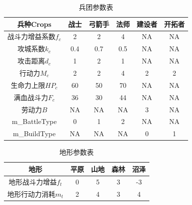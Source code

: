 \documentclass[a4paper,4pt]{article}
\begin{document}
\begin{table}[htbp]
	\centering
	\caption{兵团参数表}
	\begin{tabular}{c|c|c|c|c|c}
		\hline
		兵种Crops           & 战士 & 弓箭手 & 法师 & 建设者 & 开拓者 \bigstrut \\
		\hline
		战斗力增益系数$f_c$ & 2    & 2      & 4    & NA     & NA \bigstrut     \\
		\hline
		攻城系数$k_c$       & 0.4  & 0.7    & 0.5  & NA     & NA \bigstrut     \\
		\hline
		攻击距离$d_c$       & 1    & 2      & 1    & NA     & NA \bigstrut     \\
		\hline
		行动力$M_c$         & 2    & 2      & 4    & 2      & 2 \bigstrut      \\
		\hline
		生命力上限$HP_c$    & 60   & 50     & 70   & NA     & NA \bigstrut     \\
		\hline
		满血战斗力$F_c$     & 36   & 30     & 44   & NA     & NA \bigstrut     \\
		\hline
		劳动力$B$           & NA   & NA     & NA   & 3      & NA \bigstrut     \\
		\hline
		m\_BattleType       & 0    & 1      & 2    & NA     & NA \bigstrut     \\
		\hline
		m\_BuildType        & NA   & NA     & NA   & 0      & 1 \bigstrut      \\
		\hline
	\end{tabular}%
	\label{兵团}%
\end{table}%


\begin{table}[htbp]
	\centering
	\caption{地形参数表}
	\begin{tabular}{c|c|c|c|c|}
		\hline
		地形                & 平原 & 山地 & 森林 & 沼泽 \bigstrut \\
		\hline
		地形战斗力增益$f_t$ & 0    & 5    & 3    & -3 \bigstrut   \\
		\hline
		地形行动力消耗$m_t$ & 2    & 4    & 3    & 4 \bigstrut    \\
		\hline
	\end{tabular}%
	\label{地形}%
\end{table}%
\end{document}

